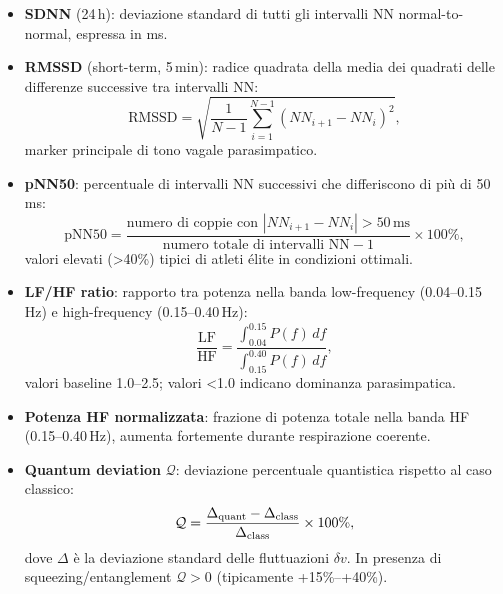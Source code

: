\documentclass[11pt,a4paper]{article}
\theoremstyle{plain}
\theoremstyle{definition}
\begin{document}
\begin{itemize}
    \item \textbf{SDNN} (24\,h): deviazione standard di tutti gli intervalli NN normal-to-normal, espressa in ms.

    \item \textbf{RMSSD} (short-term, 5\,min): radice quadrata della media dei quadrati delle differenze successive tra intervalli NN:
    \begin{equation}
    \text{RMSSD} = \sqrt{\frac{1}{N-1} \sum_{i=1}^{N-1} (NN_{i+1} - NN_i)^2},
    \label{eq:rmssd}
    \end{equation}
    marker principale di tono vagale parasimpatico.

    \vspace{0.2cm}

    \item \textbf{pNN50}: percentuale di intervalli NN successivi che differiscono di più di 50\,ms:
    \begin{equation}
    \text{pNN50} = \frac{\text{numero di coppie con } |NN_{i+1} - NN_i| > 50\,\text{ms}}{\text{numero totale di intervalli NN} - 1} \times 100\%,
    \label{eq:pnn50}
    \end{equation}
    valori elevati (>40\%) tipici di atleti élite in condizioni ottimali.

    \vspace{0.2cm}

    \item \textbf{LF/HF ratio}: rapporto tra potenza nella banda low-frequency (0.04--0.15\,Hz) e high-frequency (0.15--0.40\,Hz):
    \begin{equation}
    \frac{\text{LF}}{\text{HF}} = \frac{\int_{0.04}^{0.15} P(f)\,df}{\int_{0.15}^{0.40} P(f)\,df},
    \label{eq:lfhf}
    \end{equation}
    valori baseline 1.0--2.5; valori <1.0 indicano dominanza parasimpatica.

    
\vspace{0.2cm}


    \item \textbf{Potenza HF normalizzata}: frazione di potenza totale nella banda HF (0.15--0.40\,Hz), aumenta fortemente durante respirazione coerente.

    \vspace{0.2cm}

    \item \textbf{Quantum deviation} $\mathcal{Q}$: deviazione percentuale quantistica rispetto al caso classico:
    \begin{equation}
    \mathcal{Q} = \frac{\Delta_{\rm quant} - \Delta_{\rm class}}{\Delta_{\rm class}} \times 100\%,
    \label{eq:quantum-deviation}
    \end{equation}
    dove $\Delta$ è la deviazione standard delle fluttuazioni $\delta v$. In presenza di squeezing/entanglement $\mathcal{Q} > 0$ (tipicamente +15\%--+40\%).
\end{itemize}
\end{document}
